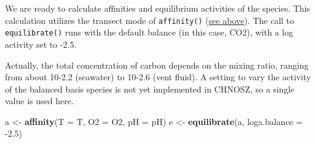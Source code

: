 \documentclass[]{tufte-handout}
\newenvironment{Shaded}{}{}
\newcommand{\KeywordTok}[1]{\textcolor[rgb]{0.00,0.44,0.13}{\textbf{#1}}}
\newcommand{\DataTypeTok}[1]{\textcolor[rgb]{0.56,0.13,0.00}{#1}}
\newcommand{\DecValTok}[1]{\textcolor[rgb]{0.25,0.63,0.44}{#1}}
\newcommand{\FloatTok}[1]{\textcolor[rgb]{0.25,0.63,0.44}{#1}}
\newcommand{\StringTok}[1]{\textcolor[rgb]{0.25,0.44,0.63}{#1}}
\newcommand{\OperatorTok}[1]{\textcolor[rgb]{0.40,0.40,0.40}{#1}}
\newcommand{\NormalTok}[1]{#1}
\begin{document}
\begin{Shaded}
\end{Shaded}

We are ready to calculate affinities and equilibrium activities of the
species. This calculation utilizes the transect mode of
{\texttt{affinity()}} (\protect\hyperlink{t-p-activity-transects}{see
above}). The call to {\texttt{equilibrate()}} runs with the default
balance (in this case, CO2), with a log activity set to -2.5.

\begin{marginfigure}
Actually, the total concentration of carbon depends on the mixing ratio,
ranging from about 10-2.2 (seawater) to 10-2.6 (vent fluid). A setting
to vary the activity of the balanced basis species is not yet
implemented in CHNOSZ, so a single value is used here.
\end{marginfigure}

\begin{Shaded}
\begin{Highlighting}[]
\NormalTok{a <-}\StringTok{ }\KeywordTok{affinity}\NormalTok{(}\DataTypeTok{T =}\NormalTok{ T, }\DataTypeTok{O2 =}\NormalTok{ O2, }\DataTypeTok{pH =}\NormalTok{ pH)}
\NormalTok{e <-}\StringTok{ }\KeywordTok{equilibrate}\NormalTok{(a, }\DataTypeTok{loga.balance =} \OperatorTok{-}\FloatTok{2.5}\NormalTok{)}
\end{Highlighting}
\end{Shaded}
\end{document}
